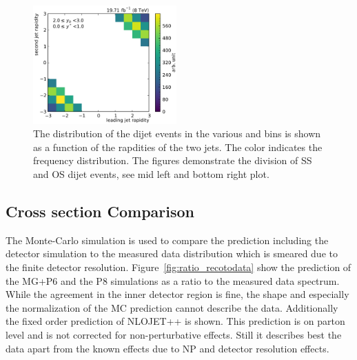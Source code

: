 \begin{figure}[htbp]
    \includegraphics[width=0.49\textwidth]{figures/measurement/jet12_rapidity_yb2ys0.pdf}
    \caption[Rapidities of the two leading jets in the various \ystar and \yboost bins]{
             The distribution of the dijet events in the various \ystar and
             \yboost bins is shown as a function of the rapdities of the two jets.
             The color indicates the frequency distribution. The figures demonstrate the
             division of SS and OS dijet events, see \eg mid left and bottom right plot.}
    \label{fig:controlplots:rapidity}
\end{figure}

\subsection{Cross section Comparison}

The Monte-Carlo simulation is used to compare the prediction including the detector simulation
to the measured data distribution which is smeared due to the finite detector resolution. Figure~\ref{fig:ratio_recotodata}
show the prediction of the MG+P6 and the P8 simulations as a ratio to the measured data spectrum.
While the agreement in the inner detector region is fine, the shape and especially the normalization
of the MC prediction cannot describe the data. Additionally the fixed order prediction of NLOJET++
is shown. This prediction is on parton level and is not corrected for non-perturbative effects. Still
it describes best the data apart from the known effects due to NP and detector resolution effects.

